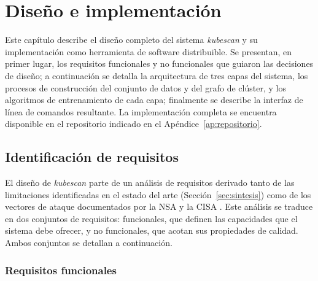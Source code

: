 \chapter{Diseño e implementación}
\label{cap:diseno}

Este capítulo describe el diseño completo del sistema \textit{kubescan} y su
implementación como herramienta de software distribuible. Se presentan, en primer lugar,
los requisitos funcionales y no funcionales que guiaron las decisiones de diseño;
a continuación se detalla la arquitectura de tres capas del sistema, los procesos de
construcción del conjunto de datos y del grafo de clúster, y los algoritmos de
entrenamiento de cada capa; finalmente se describe la interfaz de línea de comandos
resultante. La implementación completa se encuentra disponible en el repositorio
indicado en el Apéndice~\ref{ap:repositorio}.

\section{Identificación de requisitos}
\label{sec:requisitos}

El diseño de \textit{kubescan} parte de un análisis de requisitos derivado tanto de
las limitaciones identificadas en el estado del arte (Sección~\ref{sec:sintesis}) como
de los vectores de ataque documentados por la \ac{NSA} y la \ac{CISA} \citep{NSA2022}.
Este análisis se traduce en dos conjuntos de requisitos: funcionales, que definen
las capacidades que el sistema debe ofrecer, y no funcionales, que acotan sus
propiedades de calidad. Ambos conjuntos se detallan a continuación.

\subsection{Requisitos funcionales}


